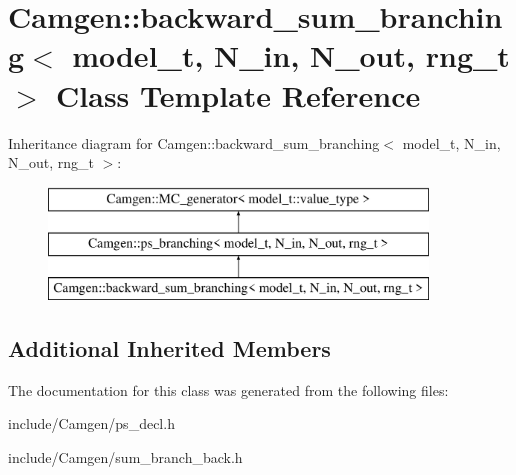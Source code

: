 \hypertarget{a00022}{\section{Camgen\-:\-:backward\-\_\-sum\-\_\-branching$<$ model\-\_\-t, N\-\_\-in, N\-\_\-out, rng\-\_\-t $>$ Class Template Reference}
\label{a00022}
}
Inheritance diagram for Camgen\-:\-:backward\-\_\-sum\-\_\-branching$<$ model\-\_\-t, N\-\_\-in, N\-\_\-out, rng\-\_\-t $>$\-:\begin{figure}[H]
\begin{center}
\leavevmode
\includegraphics[height=3.000000cm]{a00022}
\end{center}
\end{figure}
\subsection*{Additional Inherited Members}


The documentation for this class was generated from the following files\-:\begin{DoxyCompactItemize}
\item 
include/\-Camgen/ps\-\_\-decl.\-h\item 
include/\-Camgen/sum\-\_\-branch\-\_\-back.\-h\end{DoxyCompactItemize}
